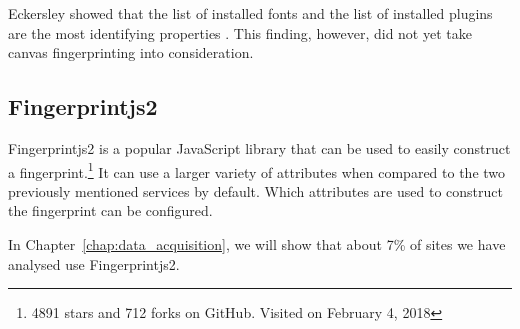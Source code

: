 \documentclass[
    fontsize=12pt,
    headings=small,
    parskip=half,
    bibliography=totoc,
    numbers=noenddot,
    open=any
    ]{scrreprt}
\begin{document}
Eckersley showed that the list of installed fonts and the list of installed plugins are the most identifying properties
\cite{eckersley2010unique}. This finding, however, did not yet take canvas fingerprinting into consideration.


\subsection{Fingerprintjs2}
\label{related_work:fingerprintjs2}
Fingerprintjs2 \cite{fingerprintjs2} is a popular JavaScript library that
can be used to easily construct a fingerprint.\footnote{4891 stars and 712 forks on GitHub. Visited on February 4, 2018}
It can use a larger variety of attributes when compared to the two previously mentioned services by default.
Which attributes are used to construct the fingerprint can be configured.

In Chapter~\ref{chap:data_acquisition}, we will show that about 7\% of sites we have analysed use Fingerprintjs2.
\end{document}
